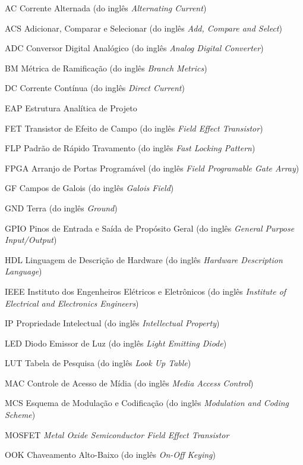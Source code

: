 \documentclass[
	12pt,				%
	openright,			%
	oneside,			%
	a4paper,			%
	hyphens,			%
	english,			%
	brazil				%
]{abntex2}
\begin{document}
	\begin{siglas}
		\item[AC] Corrente Alternada (do inglês \emph{Alternating Current})
		\item[ACS] Adicionar, Comparar e Selecionar (do inglês \emph{Add, Compare and Select})
		\item[ADC] Conversor Digital Analógico (do inglês \emph{Analog Digital Converter})
		\item[BM] Métrica de Ramificação (do inglês \emph{Branch Metrics})
		\item[DC] Corrente Contínua (do inglês \emph{Direct Current})
		\item[EAP] Estrutura Analítica de Projeto
		\item[FET] Transistor de Efeito de Campo (do inglês \emph{Field Effect Transistor})
		\item[FLP] Padrão de Rápido Travamento (do inglês \emph{Fast Locking Pattern})
		\item[FPGA] Arranjo de Portas Programável (do inglês \emph{Field Programable Gate Array})
		\item[GF] Campos de Galois (do inglês \emph{Galois Field})
		\item[GND] Terra (do inglês \emph{Ground})
		\item[GPIO] Pinos de Entrada e Saída de Propósito Geral (do inglês \emph{General Purpose Input/Output})
		\item[HDL] Linguagem de Descrição de Hardware (do inglês \emph{Hardware Description Language})
		\item[IEEE] Instituto dos Engenheiros Elétricos e Eletrônicos (do inglês \emph{Institute of Electrical and Electronics Engineers})
		\item[IP] Propriedade Intelectual (do inglês \emph{Intellectual Property})
		\item[LED] Diodo Emissor de Luz (do inglês \emph{Light Emitting Diode})
		\item[LUT] Tabela de Pesquisa (do inglês \emph{Look Up Table})
		\item[MAC] Controle de Acesso de Mídia (do inglês \emph{Media Access Control})
		\item[MCS] Esquema de Modulação e Codificação (do inglês \emph{Modulation and Coding Scheme})
		\item[MOSFET] \emph{Metal Oxide Semiconductor Field Effect Transistor}
		\item[OOK] Chaveamento Alto-Baixo (do inglês \emph{On-Off Keying})

\end{siglas}
\end{document}
